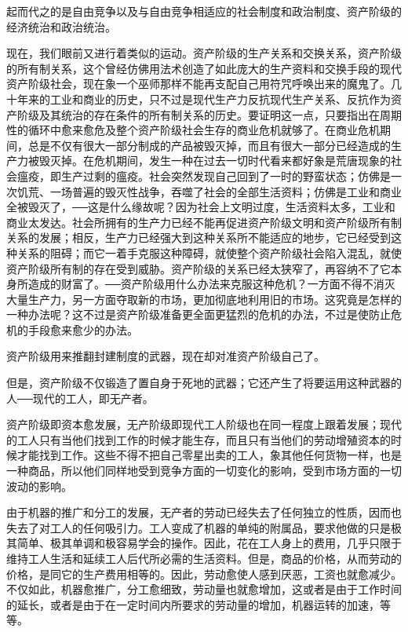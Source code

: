 \documentclass[UTF8]{ctexart}
\begin{document}
起而代之的是自由竞争以及与自由竞争相适应的社会制度和政治制度、资产阶级的经济统治和政治统治。

现在，我们眼前又进行着类似的运动。资产阶级的生产关系和交换关系，资产阶级的所有制关系，这个曾经仿佛用法术创造了如此庞大的生产资料和交换手段的现代资产阶级社会，现在象一个巫师那样不能再支配自己用符咒呼唤出来的魔鬼了。几十年来的工业和商业的历史，只不过是现代生产力反抗现代生产关系、反抗作为资产阶级及其统治的存在条件的所有制关系的历史。要证明这一点，只要指出在周期性的循环中愈来愈危及整个资产阶级社会生存的商业危机就够了。在商业危机期间，总是不仅有很大一部分制成的产品被毁灭掉，而且有很大一部分已经造成的生产力被毁灭掉。在危机期间，发生一种在过去一切时代看来都好象是荒唐现象的社会瘟疫，即生产过剩的瘟疫。社会突然发现自己回到了一时的野蛮状态；仿佛是一次饥荒、一场普遍的毁灭性战争，吞噬了社会的全部生活资料；仿佛是工业和商业全被毁灭了，──这是什么缘故呢？因为社会上文明过度，生活资料太多，工业和商业太发达。社会所拥有的生产力已经不能再促进资产阶级文明和资产阶级所有制关系的发展；相反，生产力已经强大到这种关系所不能适应的地步，它已经受到这种关系的阻碍；而它一着手克服这种障碍，就使整个资产阶级社会陷入混乱，就使资产阶级所有制的存在受到威胁。资产阶级的关系已经太狭窄了，再容纳不了它本身所造成的财富了。──资产阶级用什么办法来克服这种危机？一方面不得不消灭大量生产力，另一方面夺取新的市场，更加彻底地利用旧的市场。这究竟是怎样的一种办法呢？这不过是资产阶级准备更全面更猛烈的危机的办法，不过是使防止危机的手段愈来愈少的办法。

资产阶级用来推翻封建制度的武器，现在却对准资产阶级自己了。

但是，资产阶级不仅锻造了置自身于死地的武器；它还产生了将要运用这种武器的人──现代的工人，即无产者。

资产阶级即资本愈发展，无产阶级即现代工人阶级也在同一程度上跟着发展；现代的工人只有当他们找到工作的时候才能生存，而且只有当他们的劳动增殖资本的时候才能找到工作。这些不得不把自己零星出卖的工人，象其他任何货物一样，也是一种商品，所以他们同样地受到竞争方面的一切变化的影响，受到市场方面的一切波动的影响。

由于机器的推广和分工的发展，无产者的劳动已经失去了任何独立的性质，因而也失去了对工人的任何吸引力。工人变成了机器的单纯的附属品，要求他做的只是极其简单、极其单调和极容易学会的操作。因此，花在工人身上的费用，几乎只限于维持工人生活和延续工人后代所必需的生活资料。但是，商品的价格，从而劳动的价格，是同它的生产费用相等的。因此，劳动愈使人感到厌恶，工资也就愈减少。不仅如此，机器愈推广，分工愈细致，劳动量也就愈增加，这或者是由于工作时间的延长，或者是由于在一定时间内所要求的劳动量的增加，机器运转的加速，等等。
\end{document}
